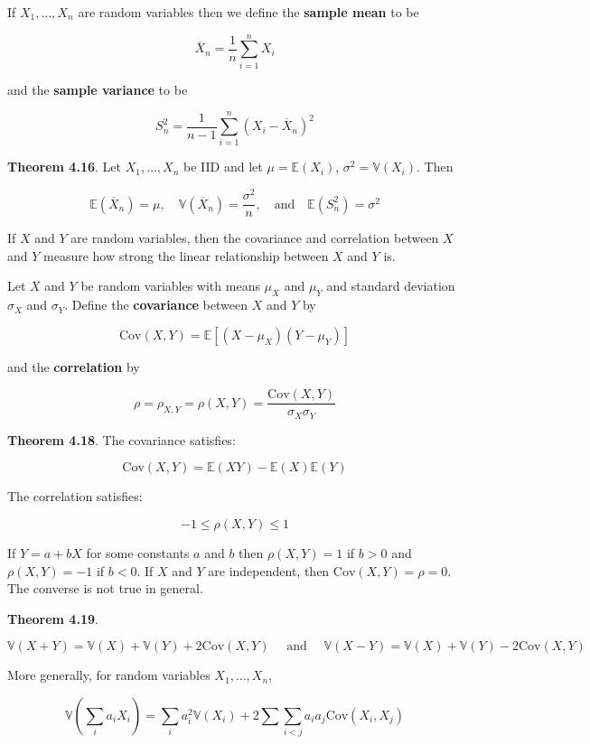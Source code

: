If \(X_1, \dots, X_n\) are random variables then we define the
\textbf{sample mean} to be

\[ \overline{X}_n = \frac{1}{n} \sum_{i=1}^n X_i  \]

and the \textbf{sample variance} to be

\[ S_n^2 = \frac{1}{n - 1} \sum_{i=1}^n \left(X_i - \overline{X}_n\right)^2 \]

\textbf{Theorem 4.16}. Let \(X_1, \dots, X_n\) be IID and let
\(\mu = \mathbb{E}(X_i)\), \(\sigma^2 = \mathbb{V}(X_i)\). Then

\[ 
\mathbb{E}\left(\overline{X}_n\right) = \mu,
\quad
\mathbb{V}\left(\overline{X}_n\right) = \frac{\sigma^2}{n},
\quad \text{and} \quad
\mathbb{E}\left(S_n^2\right) = \sigma^2
\]

If \(X\) and \(Y\) are random variables, then the covariance and
correlation between \(X\) and \(Y\) measure how strong the linear
relationship between \(X\) and \(Y\) is.

Let \(X\) and \(Y\) be random variables with means \(\mu_X\) and
\(\mu_Y\) and standard deviation \(\sigma_X\) and \(\sigma_Y\). Define
the \textbf{covariance} between \(X\) and \(Y\) by

\[ \text{Cov}(X, Y) = \mathbb{E}[(X - \mu_X)(Y - \mu_Y)] \]

and the \textbf{correlation} by

\[ \rho = \rho_{X, Y} = \rho(X, Y) = \frac{\text{Cov}(X, Y)}{\sigma_X \sigma_Y} \]

\textbf{Theorem 4.18}. The covariance satisfies:

\[ \text{Cov}(X, Y) = \mathbb{E}(XY) - \mathbb{E}(X) \mathbb{E}(Y) \]

The correlation satisfies:

\[ -1 \leq \rho(X, Y) \leq 1 \]

If \(Y = a + bX\) for some constants \(a\) and \(b\) then
\(\rho(X, Y) = 1\) if \(b > 0\) and \(\rho(X, Y) = -1\) if \(b < 0\). If
\(X\) and \(Y\) are independent, then \(\text{Cov}(X, Y) = \rho = 0\).
The converse is not true in general.

\textbf{Theorem 4.19}.

\[ 
\mathbb{V}(X + Y) = \mathbb{V}(X) + \mathbb{V}(Y) + 2 \text{Cov}(X, Y)
\quad \text{ and } \quad
\mathbb{V}(X - Y) = \mathbb{V}(X) + \mathbb{V}(Y) - 2 \text{Cov}(X, Y)
\]

More generally, for random variables \(X_1, \dots, X_n\),

\[ \mathbb{V}\left( \sum_i a_i X_i \right) = \sum_i a_i^2 \mathbb{V}(X_i) + 2 \sum \sum_{i < j} a_i a_j \text{Cov}(X_i, X_j) \]

